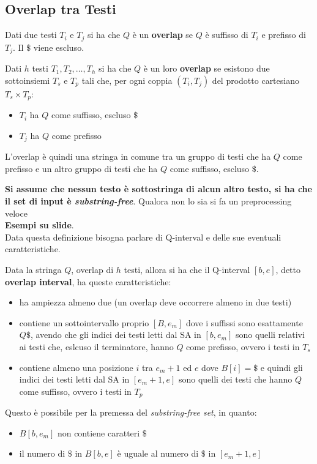 \documentclass[a4paper,12pt, oneside]{book}
\begin{document}
\subsection{Overlap tra Testi}
\begin{definizione}
  Dati due testi $T_i$ e $T_j$ si ha che $Q$ è un \textbf{overlap} se $Q$ è
  suffisso di $T_i$ e prefisso di $T_j$. Il $\$$ viene escluso.
\end{definizione}
\begin{definizione}
  Dati $h$ testi $ T_1,  T_2,  \ldots, T_h$ si ha che $Q$ è un loro
  \textbf{overlap} se esistono due sottoinsiemi $T_s$ e $T_p$ tali che, per ogni
  coppia $(T_i, T_j)$ del prodotto cartesiano $T_s\times T_p$:
  \begin{itemize}
    \item $T_i$ ha $Q$ come suffisso, escluso $\$$
    \item $T_j$ ha $Q$ come prefisso
  \end{itemize}
  L'overlap è quindi una stringa in comune tra un gruppo di testi che ha $Q$
  come prefisso e un altro gruppo di testi che ha $Q$ come suffisso, escluso
  $\$$. 
\end{definizione}
\textbf{Si assume che nessun testo è sottostringa di alcun altro testo, si ha
  che il set di input è \textit{substring-free}}. Qualora non lo sia si fa un
preprocessing veloce\\
\textbf{Esempi su slide}.\\
Data questa definizione bisogna parlare di Q-interval e delle sue eventuali
caratteristiche.
\begin{definizione}
  Data la stringa $Q$, overlap di $h$ testi, allora si ha che il Q-interval
  $[b,e]$, detto \textbf{overlap interval}, ha queste caratteristiche:
  \begin{itemize}
    \item ha ampiezza almeno due (un overlap deve occorrere almeno in due testi)
    \item contiene un sottointervallo proprio $[B,e_m]$ dove i suffissi sono
    esattamente $Q\$$, avendo che gli indici dei testi letti dal SA in $[b,e_m]$
    sono quelli relativi ai testi che, eslcuso il terminatore, hanno $Q$ come
    prefisso, ovvero i testi in $T_s$
    \item contiene almeno una posizione $i$ tra $e_m+1$ ed $e$ dove $B[i]=\$$ e
    quindi gli indici dei testi letti dal SA in $[e_m+1,e]$ sono quelli dei
    testi che  hanno $Q$ come suffisso, ovvero i testi in $T_p$
  \end{itemize}
  Questo è possibile per la premessa del \textit{substring-free set}, in quanto:
  \begin{itemize}
    \item $B[b,e_m]$ non contiene caratteri $\$$
    \item il numero di  $\$$ in $B[b,e]$ è uguale al numero di $\$$ in
    $[e_m+1,e]$ 
  \end{itemize}
\end{definizione}
\end{document}
